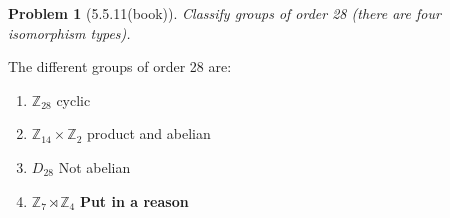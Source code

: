 \documentclass[10pt]{article}
\newcommand{\sk}{\vskip 10mm}
\newcommand{\bb}[1]{\mathbb{#1}}
\theoremstyle{plain}
\newtheorem{problem}{Problem}
\theoremstyle{remark}
\begin{document}
\sk

\begin{problem}[5.5.11(book)]
  Classify groups of order 28 (there are four isomorphism types).
\end{problem}

The different groups of order 28 are:
\begin{enumerate}
\item $\bb{Z}_{28}$ cyclic
\item $\bb{Z}_{14}\times \bb{Z}_2$ product and abelian
\item $D_{28}$ Not abelian
\item $\bb{Z}_7\rtimes\bb{Z}_4$ \textbf{Put in a reason}
\end{enumerate}

\sk

\end{document}
